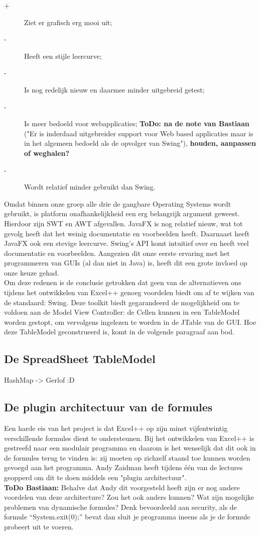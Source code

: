 \documentclass[a4paper,11pt]{article}
\begin{document}
\begin{description}
\begin{description}
			\item[+] Ziet er grafisch erg mooi uit;
			\item[-] Heeft een stijle leercurve;
			\item[-] Is nog redelijk nieuw en daarmee minder uitgebreid getest;
			\item[-] Is meer bedoeld voor webapplicaties; \textbf{ToDo: na de note van Bastiaan} ("Er is inderdaad uitgebreider support voor Web based applicaties maar is in het algemeen bedoeld als de opvolger van Swing"), \textbf{houden, aanpassen of weghalen?}
			\item[-] Wordt relatief minder gebruikt dan Swing.
		\end{description}
\end{description}

Omdat binnen onze groep alle drie de gangbare Operating Systems wordt gebruikt, is platform onafhankelijkheid een erg belangrijk argument geweest. Hierdoor zijn SWT en AWT afgevallen. JavaFX is nog relatief nieuw, wat tot gevolg heeft dat het weinig documentatie en voorbeelden heeft. Daarnaast heeft JavaFX ook een stevige leercurve. Swing's API komt intuitief over en heeft veel documentatie en voorbeelden. Aangezien dit onze eerste ervaring met het programmeren van GUIs (al dan niet in Java) is, heeft dit een grote invloed op onze keuze gehad.\\

Om deze redenen is de conclusie getrokken dat geen van de alternatieven ons tijdens het ontwikkelen van Excel++ genoeg voordelen biedt om af te wijken van de standaard: Swing. Deze toolkit biedt gegarandeerd de mogelijkheid om te voldoen aan de Model View Controller: de Cellen kunnen in een TableModel worden gestopt, om vervolgens ingelezen te worden in de JTable van de GUI. Hoe deze TableModel geconstrueerd is, komt in de volgende paragraaf aan bod.\\

\subsection{De SpreadSheet TableModel}
HashMap -> Gerlof :D

\subsection{De plugin architectuur van de formules}
Een harde eis van het project is dat Excel++ op zijn minst vijfentwintig verschillende formules dient te ondersteunen. Bij het ontwikkelen van Excel++ is gestreefd naar een modulair programma en daarom is het wenselijk dat dit ook in de formules terug te vinden is: zij moeten op zichzelf staand toe kunnen worden gevoegd aan het programma. Andy Zaidman heeft tijdens één van de lectures geopperd om dit te doen middels een "plugin architectuur".\\ \textbf{ToDo Bastiaan:} Behalve dat Andy dit voorgesteld heeft zijn er nog andere voordelen van deze architecture? Zou het ook anders kunnen? Wat zijn mogelijke problemen van dynamische formules? Denk bevoordeeld aan security, als de formule “System.exit(0);” bevat dan sluit je programma ineens als je de formule probeert uit te voeren.
\end{document}
